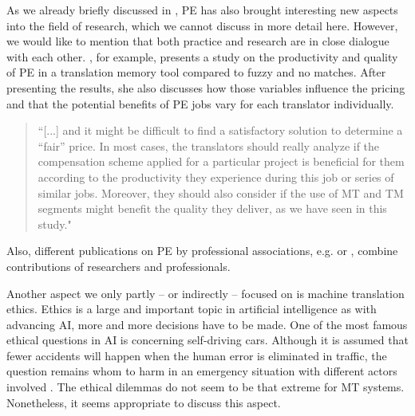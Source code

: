 As we already briefly discussed in , PE has also brought interesting new aspects into the field of research, which we cannot discuss in more detail here. However, we would like to mention that both practice and research are in close dialogue with each other. \citet{arenas2014correlations}, for example, presents a study on the productivity and quality of PE in a translation memory tool compared to fuzzy and no matches. After presenting the results, she also discusses how those variables influence the pricing and that the potential benefits of PE jobs vary for each translator individually. \begin{quote}``[...] and it might be difficult to find a satisfactory solution to determine a “fair” price. In most cases, the translators should really analyze if the compensation scheme applied for a particular project is beneficial for them according to the productivity they experience during this job or series of similar jobs. Moreover, they should also consider if the use of MT and TM segments might benefit the quality they deliver, as we have seen in this study." \citet[183]{arenas2014correlations}\end{quote}
Also, different publications on PE by professional associations, e.g. \citet{ottmann_best_2017} or \citet{porsiel_machine_2017}, combine contributions of researchers and professionals.

Another aspect we only partly -- or indirectly -- focused on is machine translation ethics. Ethics is a large and important topic in artificial intelligence \citep{liao2020ethics} as with advancing AI, more and more decisions have to be made. One of the most famous ethical questions in AI is concerning self-driving cars. Although it is assumed that fewer accidents will happen when the human error is eliminated in traffic, the question remains whom to harm in an emergency situation with different actors involved \citep{bonnefon2016social}. The ethical dilemmas do not seem to be that extreme for MT systems. Nonetheless, it seems appropriate to discuss this aspect. 

